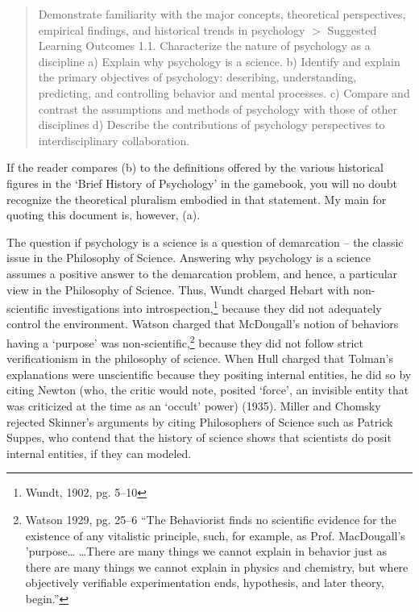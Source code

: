 \begin{quote}

Demonstrate familiarity with the major concepts, theoretical perspectives, empirical findings, and historical trends in psychology
 $>$ Suggested Learning Outcomes
 1.1. Characterize the nature of psychology as a discipline
 a) Explain why psychology is a science.
 b) Identify and explain the primary objectives of psychology: describing, understanding, predicting, and controlling behavior and mental processes.
 c) Compare and contrast the assumptions and methods of psychology with those of other disciplines
 d) Describe the contributions of psychology perspectives to interdisciplinary collaboration.
\end{quote}

If the reader compares (b) to the definitions offered by the various historical figures in the `Brief History of Psychology' in the gamebook, you will no doubt recognize the theoretical pluralism embodied in that statement. My main for quoting this document is, however, (a).

The question if psychology is a science is a question of demarcation – the classic issue in the Philosophy of Science. Answering why psychology is a science assumes a positive answer to the demarcation problem, and hence, a particular view in the Philosophy of Science. Thus, Wundt charged Hebart with non-scientific investigations into introspection,\footnote{Wundt, 1902, pg. 5--10} because they did not adequately control the environment. Watson charged that McDougall's notion of behaviors having a `purpose' was non-scientific,\footnote{Watson 1929, pg. 25--6 “The Behaviorist finds no scientific evidence for the existence of any vitalistic principle, such, for example, as Prof. MacDougall's 'purpose{\ldots} {\ldots}There are many things we cannot explain in behavior just as there are many things we cannot explain in physics and chemistry, but where objectively verifiable experimentation ends, hypothesis, and later theory, begin.”} because they did not follow strict verificationism in the philosophy of science. When Hull charged that Tolman's explanations were unscientific because they positing internal entities, he did so by citing Newton (who, the critic would note, posited `force', an invisible entity that was criticized at the time as an `occult' power) (1935). Miller and Chomsky rejected Skinner's arguments by citing Philosophers of Science such as Patrick Suppes, who contend that the history of science shows that scientists do posit internal entities, if they can modeled.

